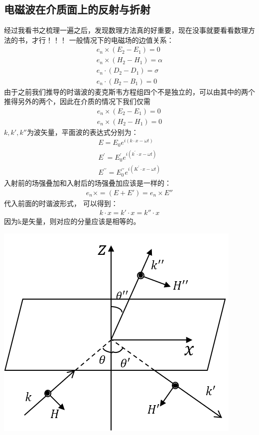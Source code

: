 \documentclass[UTF8]{article}
\begin{document}
\subsection{电磁波在介质面上的反射与折射}
经过我看书之梳理一遍之后，发现数理方法真的好重要，现在没事就要看看数理方法的书，才行！！！
一般情况下的电磁场的边值关系：
$$
    \begin{array}{l}
        e_{ n } \times\left( E _{2}- E _{1}\right)=0       \\
        e_{ n } \times\left( H _{2}- H _{1}\right)= \alpha \\
        e _{ n } \cdot\left( D _{2}- D _{1}\right)=\sigma  \\
        e _{ n } \cdot\left( B _{2}- B _{1}\right)=0
    \end{array}
$$
由于之前我们推导的时谐波的麦克斯韦方程组四个不是独立的，可以由其中的两个推得另外的两个，因此在介质的情况下我们仅需
\begin{align*}
    e_n\times(E_2-E_1)=0 \\
    e_n\times (H_2-H_1)=0
\end{align*}
$k,k',k''$为波矢量，平面波的表达式分别为：
$$
    \begin{array}{l}
        E = E _{0} e ^{ i (k \cdot x-\omega t)}                                         \\
        E ^{\prime}= E _{0}^{\prime} e ^{ i \left( k ^{\prime} \cdot x-\omega t\right)} \\
        E ^{\prime \prime}= E _{0}^{\prime \prime} e ^{ i \left( K ^{\prime} \cdot x-\omega t\right)}
    \end{array}
$$
入射前的场强叠加和入射后的场强叠加应该是一样的：
\begin{align*}
    e_n\times = (E+E')=e_n\times E''
\end{align*}
代入前面的时谐波形式，
可以得到：
\begin{align*}
    k\cdot x=k' \cdot x=k''\cdot x
\end{align*}
因为k是矢量，则对应的分量应该是相等的。
\begin{center}
    \includegraphics[scale=0.7]{img/fanshe.png}
\end{center}
\end{document}
